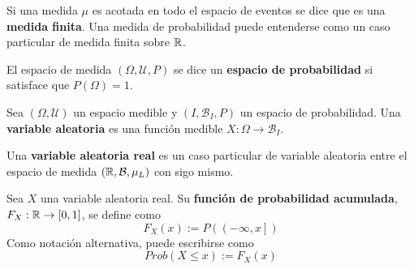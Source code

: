 Si una medida $\mu$ es acotada en todo el espacio de eventos se dice que es una \textbf{medida finita}.%
%
Una medida de probabilidad puede entenderse como un caso particular de medida finita sobre $\mathbb{R}$.

\begin{definicion}
El espacio de medida $(\Omega,\mathcal{U},P)$ se dice un \textbf{espacio de probabilidad} si satisface que $P(\Omega) = 1$.
\end{definicion}


\begin{definicion}
Sea $(\Omega,\mathcal{U})$ un espacio medible y $(I,\mathcal{B}_I,P)$ un espacio de probabilidad. Una \textbf{variable aleatoria} es una función medible $X: \Omega \rightarrow \mathcal{B}_I$.
\end{definicion}

\begin{definicion}
Una \textbf{variable aleatoria real} es un caso particular de variable aleatoria entre el espacio de medida $(\mathbb{R},\mathcal{B},\mu_L)$ con sigo mismo.
\end{definicion}


\begin{definicion}%
Sea $X$ una variable aleatoria real. Su \textbf{función de probabilidad acumulada}, $F_X : \mathbb{R} \rightarrow [0,1]$, se define como
\begin{equation*}
F_X (x) := P\left( \left(-\infty,x \right] \right)
\end{equation*}
Como notación alternativa, puede escribirse como
\begin{equation}
Prob(X\leq x) := F_X(x) 
\end{equation}
\end{definicion}

